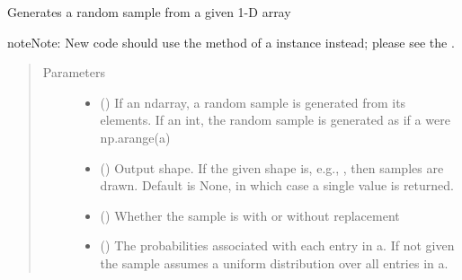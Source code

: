 \documentclass[letterpaper,10pt,english]{sphinxmanual}
\begin{document}
\begin{fulllineitems}
\label{\detokenize{tyche:tyche.Distributions.choice}}
Generates a random sample from a given 1-D array


\begin{sphinxadmonition}{note}{Note:}
New code should use the  method of a 
instance instead; please see the .
\end{sphinxadmonition}
\begin{quote}\begin{description}
\item[{Parameters}] \leavevmode\begin{itemize}
\item {} 
 () \textendash{} If an ndarray, a random sample is generated from its elements.
If an int, the random sample is generated as if a were np.arange(a)

\item {} 
 (\sphinxstyleliteralemphasis{\sphinxupquote{, }}) \textendash{} Output shape.  If the given shape is, e.g., , then
 samples are drawn.  Default is None, in which case a
single value is returned.

\item {} 
 (\sphinxstyleliteralemphasis{\sphinxupquote{, }}) \textendash{} Whether the sample is with or without replacement

\item {} 
 (\sphinxstyleliteralemphasis{\sphinxupquote{, }}) \textendash{} The probabilities associated with each entry in a.
If not given the sample assumes a uniform distribution over all
entries in a.


\end{itemize}
\end{description}
\end{quote}
\end{fulllineitems}
\end{document}
